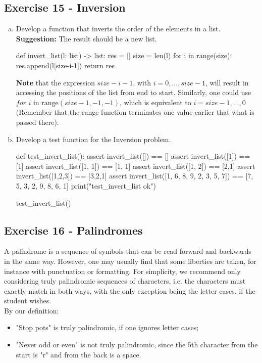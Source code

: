\documentclass[12pt]{article}
\begin{document}
\subsection*{Exercise 15 - Inversion}
\begin{enumerate}[a)]
  \item Develop a function that inverts the order of the elements in a list. 
    \textbf{Suggestion:} The result should be a new list.
\begin{pythonlst}
def invert_list(l: list) -> list:
  res = []
  size = len(l)
  for i in range(size):
    res.append(l[size-i-1])
  return res
\end{pythonlst}
\textbf{Note} that the expression $size-i-1$, with $i = 0, ..., size-1$, will 
result in accessing the positions of the list from end to start. Similarly, one
could use $\textit{for } i \text{ in range}(size-1, -1, -1)$, which is equivalent
to $i = size-1, ..., 0$ (Remember that the range function terminates one value
earlier that what is passed there).
  \item Develop a test function for the Inversion problem.
\begin{pythonlst}
def test_invert_list():
  assert invert_list([]) == []
  assert invert_list([1]) == [1]
  assert invert_list([1, 1]) == [1, 1]
  assert invert_list([1, 2]) == [2,1]
  assert invert_list([1,2,3]) == [3,2,1]
  assert invert_list([1, 6, 8, 9, 2, 3, 5, 7]) == [7, 5, 3, 2, 9, 8, 6, 1]
  print("test_invert_list ok")

test_invert_list()
\end{pythonlst}
\end{enumerate}

\subsection*{Exercise 16 - Palindromes}
A palindrome is a sequence of symbols that can be read forward and backwards
in the same way. However, one may usually find that some liberties are taken,
for instance with punctuation or formatting. For simplicity, we recommend
only considering truly palindromic sequences of characters, i.e. the characters
must exactly match in both ways, with the only exception being the letter cases, 
if the student wishes. \\

\noindent By our definition:
\noindent \begin{itemize}
  \item "Stop pots" is truly palindromic, if one ignores letter cases;
  \item "Never odd or even" is not truly palindromic, since the 5th character 
    from the start is "r" and from the back is a space.
\end{itemize}
\end{document}
